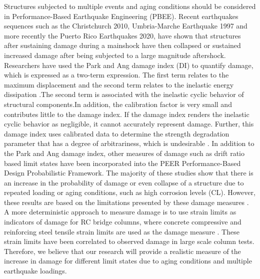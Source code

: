 Structures subjected to multiple events and aging conditions should be considered in Performance-Based Earthquake Engineering (PBEE). Recent earthquakes sequences such as the Christchurch 2010, Umbria-Marche Earthquake 1997 and more recently the Puerto Rico Earthquakes 2020, have shown that structures after sustaining damage during a mainshock have then collapsed or sustained increased damage after being subjected to a large magnitude aftershock\cite{Amato1998}\cite{Bradley}\cite{Miranda2020}. Researchers have used the Park and Ang damage index (DI) to quantify damage, which is expressed as a two-term expression. The first term relates to the maximum displacement and the second term relates to the inelastic energy dissipation \cite{Young-JiPark1985}.The second term is associated with the inelastic cyclic behavior of structural components.In addition, the calibration factor is very small and contributes little to the damage index. If the damage index renders the inelastic cyclic behavior as negligible, it cannot accurately represent damage. Further, this damage index uses calibrated data to determine the strength degradation parameter that has a degree of arbitrariness, which is undesirable \cite{Williams1995}. In addition to the Park and Ang damage index, other measures of damage such as drift ratio based limit states have been incorporated into the PEER Performance-Based Design Probabilistic Framework\cite{Padgett2007}\cite{Ghosh2015}\cite{Shekhar2018}. The majority of these studies show that there is an increase in the probability of damage or even collapse of a structure due to repeated loading or aging conditions, such as high corrosion levels (CL). However, these results are based on the limitations presented by these damage measures \cite{Shekhar2018}. A more deterministic approach to measure damage is to use strain limits as indicators of damage for RC bridge columns, where concrete compressive and reinforcing steel tensile strain limits are used as the damage measure \cite{Goodnight2016}. These strain limits have been correlated to observed damage in large scale column tests. Therefore, we believe that our research will provide a realistic measure of the increase in damage for different limit states due to aging conditions and multiple earthquake loadings. 

